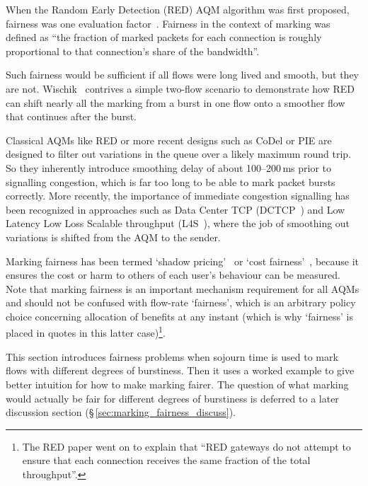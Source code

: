 When the Random Early Detection (RED) AQM algorithm was first proposed, fairness was one evaluation factor~\cite[\S\,8]{Floyd93:RED}. Fairness in the context of marking was defined as ``the fraction of marked packets for each connection is roughly proportional to that connection’s share of the bandwidth''. 

Such fairness would be sufficient if all flows were long lived and smooth, but they are not.  Wischik~\cite{Wischik99:Mark_Fairly} contrives a simple two-flow scenario to demonstrate how RED can shift nearly all the marking from a burst in one flow onto a smoother flow that continues after the burst. %

Classical AQMs like RED or more recent designs such as CoDel or PIE are designed to filter out variations in the queue over a likely maximum round trip. So they inherently introduce smoothing delay of about 100--200\,ms prior to signalling congestion, which is far too long to be able to mark packet bursts correctly. More recently, the importance of immediate congestion signalling has been recognized in approaches such as Data Center TCP (DCTCP~\cite{Alizadeh10:DCTCP}) and Low Latency Low Loss Scalable throughput (L4S~\cite{Briscoe16a:l4s-arch_ID}), where the job of smoothing out variations is shifted from the AQM to the sender.

Marking fairness has been termed `shadow pricing'~\cite{Kelly98:Shadow_prices_prop_fair} or `cost fairness'~\cite{Briscoe06g:Rate_fair_Dis}, because it ensures the cost or harm to others of each user's behaviour can be measured. Note that marking fairness is an important mechanism requirement for all AQMs and should not be confused with flow-rate `fairness', which is an arbitrary policy choice concerning allocation of benefits at any instant (which is why `fairness' is placed in quotes in this latter case)\footnote{The RED paper went on to explain that ``RED gateways do not attempt to ensure that each connection receives the same fraction of the total throughput''.}. 

This section introduces fairness problems when sojourn time is used to mark flows with different degrees of burstiness. Then it uses a worked example to give better intuition for how to make marking fairer. The question of what marking would actually be fair for different degrees of burstiness is deferred to a later discussion section (\S\,\ref{sec:marking_fairness_discuss}). 

